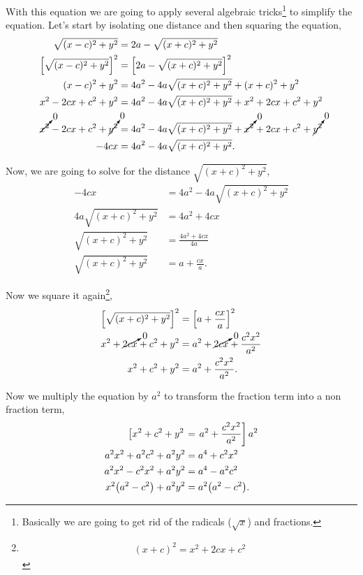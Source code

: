 \documentclass[../main-notes.tex]{subfiles}
\begin{document}
With this equation we are going to apply several algebraic tricks\footnote{
    Basically we are going to get rid of the radicals ($\sqrt{x}$) and fractions.
} to simplify the equation.
Let's start by isolating one distance and then squaring the equation,
\begin{align*}
    \sqrt{(x-c)^2+y^2} &= 2a - \sqrt{(x+c)^2+y^2} \\
    \qty[\sqrt{(x-c)^2+y^2}]^2 &= \qty[2a - \sqrt{(x+c)^2+y^2}]^2 \\
    (x-c)^2+y^2 &= 4a^2 -4a\sqrt{(x+c)^2+y^2} + (x+c)^2+y^2 \\
    x^2-2cx+c^2+y^2 &= 4a^2 -4a\sqrt{(x+c)^2+y^2} + x^2 +2cx +c^2 +y^2\\
    \cancelto{0}{x^2}
    -2cx+c^2
    +\cancelto{0}{y^2} &= 4a^2 -4a\sqrt{(x+c)^2+y^2} + \cancelto{0}{x^2} +2cx +c^2 +\cancelto{0}{y^2}\\
    -4cx &= 4a^2 -4a\sqrt{(x+c)^2+y^2}.
\end{align*}

Now, we are going to solve for the distance $\sqrt{(x+c)^2+y^2}$,
\begin{align*}
    -4cx &= 4a^2 -4a\sqrt{(x+c)^2+y^2} \\
    4a\sqrt{(x+c)^2+y^2} &= 4a^2 + 4cx \\
    \sqrt{(x+c)^2+y^2} &= \frac{4a^2 + 4cx}{4a} \\
    \sqrt{(x+c)^2+y^2} &= a + \frac{cx}{a}.
\end{align*}

Now we square it again\footnote{
    \begin{gather*}
        (x+c)^2 = x^2 +2cx + c^2
    \end{gather*}
},
\begin{align*}
    \qty[\sqrt{(x+c)^2+y^2}]^2 &= \qty[a + \frac{cx}{a}]^2 \\
    x^2 +\cancelto{0}{2cx} + c^2 + y^2 &= a^2 +\cancelto{0}{2cx} + \frac{c^2x^2}{a^2} \\
    x^2 + c^2 + y^2 &= a^2 + \frac{c^2x^2}{a^2}.
\end{align*}

Now we multiply the equation by $a^2$ to transform the fraction term into a non fraction term,
\begin{align*}
    \left[x^2 + c^2 + y^2\right. &= \left.a^2 + \frac{c^2x^2}{a^2}\right]a^2 \\
    a^2x^2 + a^2c^2 + a^2y^2 &= a^4 + c^2x^2 \\
    a^2x^2 - c^2x^2 + a^2y^2 &= a^4 - a^2c^2  \\
    x^2\qty(a^2 - c^2) + a^2y^2 &= a^2\qty(a^2 - c^2).
\end{align*}
\end{document}
